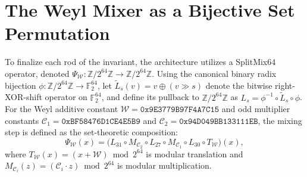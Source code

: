 \documentclass[11pt, a4paper]{article}
\begin{document}
\section{The Weyl Mixer as a Bijective Set Permutation}

To finalize each rod of the invariant, the architecture utilizes a SplitMix64 operator, denoted $\Psi_{\mathcal{W}} : \mathbb{Z}/2^{64}\mathbb{Z} \to \mathbb{Z}/2^{64}\mathbb{Z}$. Using the canonical binary radix bijection $\phi : \mathbb{Z}/2^{64}\mathbb{Z} \to \mathbb{F}_2^{64}$, let $\widetilde{L}_s(v) = v \oplus (v \gg s)$ denote the bitwise right-XOR-shift operator on $\mathbb{F}_2^{64}$, and define its pullback to $\mathbb{Z}/2^{64}\mathbb{Z}$ as $L_s = \phi^{-1} \circ \widetilde{L}_s \circ \phi$. For the Weyl additive constant $\mathcal{W} = \texttt{0x9E3779B97F4A7C15}$ and odd multiplier constants $\mathcal{C}_1 = \texttt{0xBF58476D1CE4E5B9}$ and $\mathcal{C}_2 = \texttt{0x94D049BB133111EB}$, the mixing step is defined as the set-theoretic composition:
\[
\Psi_{\mathcal{W}}(x) = \bigl(L_{31} \circ M_{\mathcal{C}_2} \circ L_{27} \circ M_{\mathcal{C}_1} \circ L_{30} \circ T_{\mathcal{W}}\bigr)(x),
\]
where $T_{\mathcal{W}}(x) = (x + \mathcal{W}) \bmod 2^{64}$ is modular translation and $M_{\mathcal{C}_i}(z) = (\mathcal{C}_i \cdot z) \bmod 2^{64}$ is modular multiplication.
\end{document}
